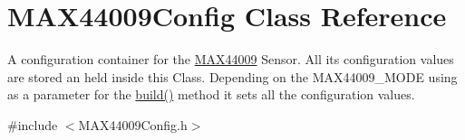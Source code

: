 \hypertarget{class_m_a_x44009_config}{}\section{M\+A\+X44009\+Config Class Reference}
\label{class_m_a_x44009_config}


A configuration container for the \hyperlink{class_m_a_x44009}{M\+A\+X44009} Sensor. All its configuration values are stored an held inside this Class. Depending on the M\+A\+X44009\+\_\+\+M\+O\+D\+E using as a parameter for the \hyperlink{class_m_a_x44009_config_a2879fcff8331e54ab1ee8bf54a386f6e}{build()} method it sets all the configuration values.  




{\ttfamily \#include $<$M\+A\+X44009\+Config.\+h$>$}

